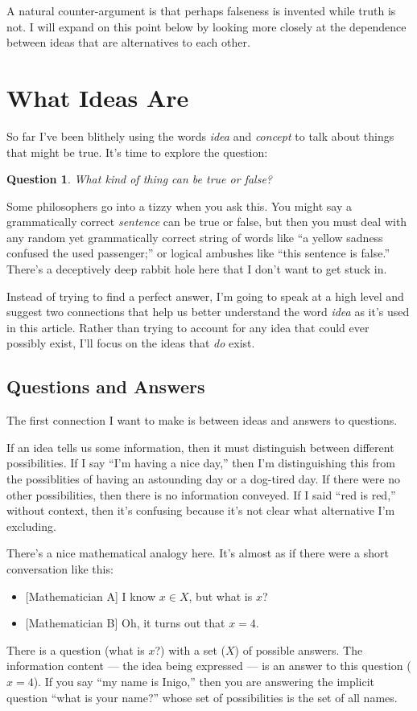 \documentclass[11pt, oneside]{article}   	%
\newtheorem{question}{Question}
\begin{document}
A natural counter-argument is that perhaps falseness is invented while truth is
not.
I will expand on this point below %
by looking more closely at the dependence between ideas that are alternatives to
each other.

\section{What Ideas Are}

So far I've been blithely using the words {\em idea} and {\em concept} to talk
about things that might be true. It's time to explore the
question:
\begin{question}
    What kind of thing can be true or false?
\end{question}

Some philosophers go into a tizzy when you ask this.
You might say a grammatically correct {\em sentence} can be true or false,
but then you must deal with any random yet grammatically correct string
of words
like ``a yellow sadness confused the used
passenger;'' or logical ambushes like ``this sentence is false.''
There's a deceptively deep rabbit hole here that I don't want to get stuck in.

Instead of trying to find a perfect answer, I'm going to speak at a high level
and suggest two connections that help us better understand the word {\em idea}
as it's used in this article. Rather than trying to account for any idea that
could ever possibly exist, I'll focus on the ideas that {\em do} exist.

\subsection{Questions and Answers}

The first connection I want to make is between ideas and answers to questions.

If an idea tells us some information, then it must distinguish between different
possibilities. If I say ``I'm having a nice day,'' then I'm distinguishing this
from the possiblities of having an astounding day or a dog-tired day.
If there were no other possibilities,
then there is no information conveyed. If I said
``red is red,'' without context, then it's confusing because it's not clear what
alternative I'm excluding.

There's a nice mathematical analogy here. It's almost as if there were a short
conversation like this:
\begin{itemize}
    \item{} [Mathematician A] I know $x\in X$, but what is $x$?
    \item{} [Mathematician B] Oh, it turns out that $x=4$.
\end{itemize}
There is a question (what is $x$?) with a set ($X$) of possible answers. The
information content --- the idea being expressed ---
is an answer to this question ($x=4$). If you say ``my name is Inigo,''
then you are answering the implicit question ``what is your name?'' whose set of
possibilities is the set of all names.
\end{document}
